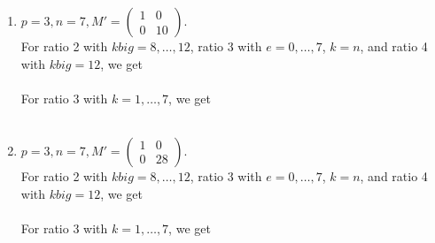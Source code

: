 \documentclass[letterpaper,12pt]{article}
\begin{document}
\begin{enumerate}
\item $p=3, n=7, M' = \begin{pmatrix}
1 & 0 \\ 0 & 10
\end{pmatrix}.$ \\
For ratio 2 with $kbig = 8, \dots, 12$, ratio 3 with $e = 0, \dots, 7$, $k=n$, and ratio 4 with $kbig = 12$, we get \\
 \\
For ratio 3 with $k = 1, \dots, 7$, we get \\
 \\

\item $p=3, n=7, M' = \begin{pmatrix}
1 & 0 \\ 0 & 28
\end{pmatrix}.$ \\
For ratio 2 with $kbig = 8, \dots, 12$, ratio 3 with $e = 0, \dots, 7$, $k=n$, and ratio 4 with $kbig = 12$, we get \\
 \\
For ratio 3 with $k = 1, \dots, 7$, we get \\
 \\


\end{enumerate}
\end{document}
